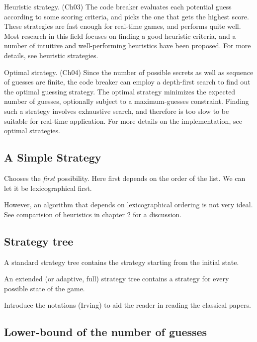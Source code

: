 Heuristic strategy. (Ch03) The code breaker evaluates each potential guess according to some scoring criteria, and picks the one that gets the highest score. These strategies are fast enough for real-time games, and performs quite well. Most research in this field focuses on finding a good heuristic criteria, and a number of intuitive and well-performing heuristics have been proposed. For more details, see heuristic strategies.

Optimal strategy. (Ch04) Since the number of possible secrets as well as sequence of guesses are finite, the code breaker can employ a depth-first search to find out the optimal guessing strategy. The optimal strategy minimizes the expected number of guesses, optionally subject to a maximum-guesses constraint. Finding such a strategy involves exhaustive search, and therefore is too slow to be suitable for real-time application. For more details on the implementation, see optimal strategies.

\subsection{A Simple Strategy}

Chooses the \emph{first} possibility. Here first depends on the order of the list. We can let it be lexicographical first. 

However, an algorithm that depends on lexicographical ordering is not very ideal. See comparision of heuristics in chapter 2 for a discussion.
 
\subsection{Strategy tree}

A standard strategy tree contains the strategy starting from the initial state.

An extended (or adaptive, full) strategy tree contains a strategy for every possible state of the game.

Introduce the notations (Irving) to aid the reader in reading the classical papers.
  
\subsection{Lower-bound of the number of guesses}


























